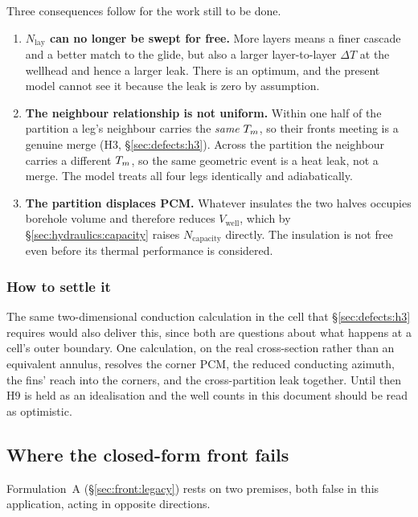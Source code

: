 Three consequences follow for the work still to be done.

\begin{enumerate}[leftmargin=1.7em,itemsep=3pt]
\item \textbf{$N_{\mathrm{lay}}$ can no longer be swept for free.} More layers
  means a finer cascade and a better match to the glide, but also a larger
  layer-to-layer $\Delta T$ at the wellhead and hence a larger leak. There is an
  optimum, and the present model cannot see it because the leak is zero by
  assumption.
\item \textbf{The neighbour relationship is not uniform.} Within one half of the
  partition a leg's neighbour carries the \emph{same} $T_{m}$, so their fronts
  meeting is a genuine merge (H3, \S\ref{sec:defects:h3}). Across the partition
  the neighbour carries a different $T_{m}$, so the same geometric event is a heat
  leak, not a merge. The model treats all four legs identically and adiabatically.
\item \textbf{The partition displaces PCM.} Whatever insulates the two halves
  occupies borehole volume and therefore reduces $V_{\mathrm{well}}$, which by
  \S\ref{sec:hydraulics:capacity} raises $N_{\mathrm{capacity}}$ directly. The
  insulation is not free even before its thermal performance is considered.
\end{enumerate}

\subsubsection*{How to settle it}

The same two-dimensional conduction calculation in the cell that
\S\ref{sec:defects:h3} requires would also deliver this, since both are
questions about what happens at a cell's outer boundary. One calculation, on the
real cross-section rather than an equivalent annulus, resolves the corner PCM,
the reduced conducting azimuth, the fins' reach into the corners, and the
cross-partition leak together. Until then H9 is held as an idealisation and the
well counts in this document should be read as optimistic.

\subsection{Where the closed-form front fails}

Formulation~A (\S\ref{sec:front:legacy}) rests on two premises, both false in
this application, acting in opposite directions.

